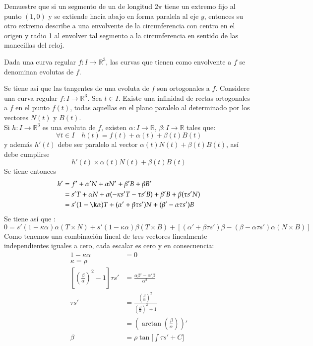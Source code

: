 Demuestre que si un segmento de un de longitud $2\pi$ tiene un extremo fijo al
punto $(1,0)$ y se extiende hacia abajo en forma paralela al eje $y$, entonces
su otro extremo describe a una envolvente de la circunferencia con centro en el
origen y radio 1 al envolver tal segmento a la circunferencia en sentido de las
manecillas del reloj.

\begin{definition}
  Dada una curva regular $f: I \to \mathbb{R}^3$, las curvas que tienen como
  envolvente a $f$ se denominan evolutas de $f$. 
\end{definition}
Se tiene así que las tangentes de una evoluta de $f$ son ortogonales a $f$.
Considere una curva regular $f:I \to \mathbb{R}^3$. Sea $t \in I$. Existe una
infinidad de rectas ortogonales a $f$ en el punto $f(t)$, todas aquellas en el
plano paralelo al determinado por los vectores $N(t)$ y $B(t)$. \\
Si $h: I \to \mathbb{R}^3$ es una evoluta de $f$, existen $\alpha: I \to
\mathbb{R}$, $\beta: I \to \mathbb{R}$ tales que:
\[
  \forall t \in I \quad h(t) = f(t) + \alpha(t) + \beta(t)B(t)
\]
y además $h'(t)$ debe ser paralelo al vector $\alpha(t) N (t) + \beta(t) B(t)$,
así debe cumplirse
\[
  h'(t) \times \alpha(t) N (t) + \beta(t) B(t)
\]
Se tiene entonces
\begin{align*}
  h' &= f'  + \alpha' N + \alpha N' + \beta' B + \beta B' \\
     &= s'T +  \alpha N + \alpha (- \kappa s'T - \tau s' B) +\beta'B +
     \beta(\tau s' N) \\
     &= s'(1-\k\alpha)T + (\alpha' + \beta \tau s')N + (\beta' - \alpha \tau
     s')B
\end{align*}
Se tiene así que :
\[
  0 = s'(1-\kappa \alpha) \alpha (T \times N) + s' (1-\kappa\alpha)\beta(T\times
  B) + [(\alpha' + \beta \tau s') \beta - (\beta- \alpha \tau s')\alpha (N
  \times B)]
\]
Como tenemos una combinación lineal de tres vectores linealmente independientes
iguales a cero, cada escalar es cero y en consecuencia:
\begin{align*}
  1- \kappa \alpha &= 0 \\
  \kappa = \rho \\
  [(\frac{\beta}{\alpha})^2 -1 ]\tau s' &=  \frac{\alpha\beta' -
  \alpha'\beta}{\alpha^2}\\
  \tau s' &= \frac{(\frac{\beta}{\alpha})^2}{(\frac{\beta}{\alpha})^2 + 1} \\
          &= (\arctan (\frac{\beta}{\alpha}))'  \\
  \beta &= \rho \tan\big[ \int \tau s'  + C \big]
\end{align*}
